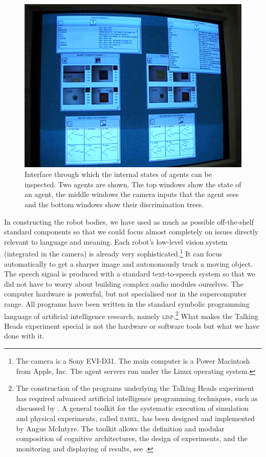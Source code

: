 \begin{figure}[htbp]
  \centerline{\includegraphics[width=.75\textwidth]{chap1/figs/Interface.pdf}}
\caption{Interface through which the internal states of agents can 
be inspected. Two agents are shown. The top windows show the state of an agent, 
the middle windows the camera inputs that the agent sees and the bottom windows show 
their discrimination trees.}
\label{f:agentview}
\end{figure}

In constructing the robot bodies, we have used as much as
possible off-the-shelf standard 
components so that we could focus almost completely on issues
directly relevant to language and meaning.
Each robot's low-level vision system
(integrated in the camera) is already very sophisticated.\footnote{The camera is a Sony EVI-D31. The main computer is a Power 
Macintosh from Apple, Inc. The agent servers run under the 
Linux operating system.}
It can focus automatically to get a sharper image
and autonomously track a moving object. The speech signal is 
produced with a standard text-to-speech system 
so that we did not have to 
worry about building complex audio modules ourselves.
The computer hardware 
is powerful, but not specialised nor in the supercomputer 
range. All programs have been written in the standard symbolic 
programming language of artificial intelligence 
research, namely \textsc{lisp}.\footnote{The construction of the programs underlying the 
Talking Heads experiment has required advanced
artificial intelligence programming techniques, 
such as discussed by \cite{Norvig:1996}. A general
toolkit for the systematic execution of 
simulation and physical experiments, called \textsc{babel}, has been
designed and implemented by Angus McIntyre. The 
toolkit allows the definition and modular composition
of cognitive architectures, the design of 
experiments, and the monitoring and displaying of 
results, see \cite{McIntyre:1998}.} What makes the Talking Heads experiment
special is not the hardware or software tools
but what we have done with it.


